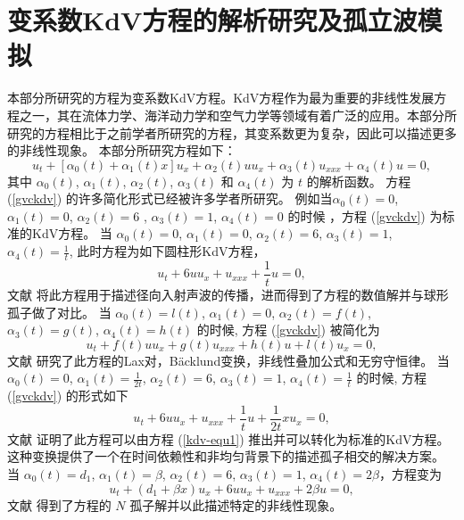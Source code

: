 ﻿\chapter{变系数KdV方程的解析研究及孤立波模拟}
本部分所研究的方程为变系数KdV方程。KdV方程作为最为重要的非线性发展方程之一，其在流体力学、海洋动力学和空气力学等领域有着广泛的应用。本部分所研究的方程相比于之前学者所研究的方程，其变系数更为复杂，因此可以描述更多的非线性现象。
本部分所研究方程如下：
\begin{equation}
u_t+[\alpha _0(t)+\alpha _1(t)x]u_x+ \alpha _2(t)u u_x+ \alpha _3(t) u_{xxx} + \alpha _4(t)u=0,\label{gvckdv}
\end{equation}
其中 $\alpha _0(t)$, $\alpha _1(t)$, $\alpha _2(t)$, $\alpha _3(t)$
  和 $\alpha _4(t)$ 为 $t$ 的解析函数。
方程 (\ref{gvckdv}) 的许多简化形式已经被许多学者所研究。
例如当$ \alpha _0(t)=0$, $\alpha _1(t)=0$, $\alpha _2(t)=6$ , $\alpha _3(t)=1$, $\alpha _4(t)=0$
的时候 ，方程 (\ref{gvckdv}) 为标准的KdV方程。
当 $\alpha _0(t)=0$, $\alpha _1(t)=0$, $\alpha _2(t)=6$, $\alpha _3(t)=1$, $\alpha _4(t)=\frac{1}{t}$, 此时方程为如下圆柱形KdV方程，
\begin{equation}
u_t+ 6u u_x+u_{xxx} + \frac{1}{t} u=0,\label{kdv-equ1}
\end{equation}
文献 \cite{kdv-4} 将此方程用于描述径向入射声波的传播，进而得到了方程的数值解并与球形孤子做了对比。
当 $ \alpha _0(t)=l(t)$, $\alpha _1(t)=0$, $\alpha _2(t)=f(t)$, $\alpha _3(t)=g(t)$, $\alpha _4(t)=h(t)$ 的时候, 方程 (\ref{gvckdv}) 被简化为
\begin{equation}
u_t+ f(t)u u_x+g(t)u_{xxx} + h(t) u+l(t)u_x=0,\label{kdv-equ2}
\end{equation}
文献 \cite{kdv-5} 研究了此方程的Lax对，B\"{a}cklund变换，非线性叠加公式和无穷守恒律。
当 $ \alpha _0(t)=0$, $\alpha _1(t)=\frac{1}{2t}$, $\alpha _2(t)=6$, $\alpha _3(t)=1$, $\alpha _4(t)=\frac{1}{t}$ 的时候, 方程 (\ref{gvckdv}) 的形式如下
\begin{equation}
u_t+ 6u u_x+u_{xxx} + \frac{1}{t} u+\frac{1}{2t} x u_x=0,\label{kdv-equ3}
\end{equation}
文献 \cite{kdv-6} 证明了此方程可以由方程 (\ref{kdv-equ1}) 推出并可以转化为标准的KdV方程。
这种变换提供了一个在时间依赖性和非均匀背景下的描述孤子相交的解决方案。
当 $\alpha _0(t)=d_1$, $\alpha _1(t)=\beta$, $\alpha _2(t)=6$, $\alpha _3(t)=1$, $\alpha _4(t)=2\beta$，方程变为
\begin{equation}
u_t+(d_1+\beta x )u_x+ 6u u_x+u_{xxx} + 2 \beta u=0,\label{kdv-equ4}
\end{equation}
文献 \cite{kdv-7} 得到了方程的 $N$ 孤子解并以此描述特定的非线性现象。

